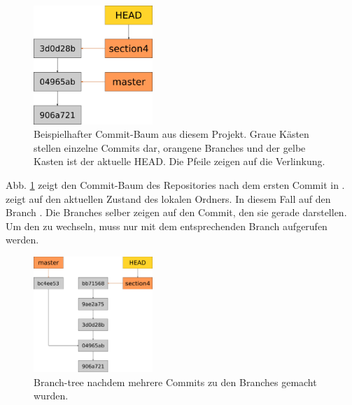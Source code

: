 \begin{figure}[!h]
	\centering
	\includegraphics[width=0.4\textwidth]{Bilder/branching.png}
	\caption{Beispielhafter Commit-Baum aus diesem Projekt. Graue Kästen stellen einzelne Commits dar, orangene Branches und der gelbe Kasten ist der aktuelle HEAD. Die Pfeile zeigen auf die Verlinkung.}
	\label{fig:branch_1}
\end{figure}
Abb. \ref{fig:branch_1} zeigt den Commit-Baum des Repositories nach dem ersten Commit in .  zeigt auf den aktuellen Zustand des lokalen Ordners. In diesem Fall auf den Branch . Die Branches selber zeigen auf den Commit, den sie gerade darstellen. Um den  zu wechseln, muss nur  mit dem entsprechenden Branch aufgerufen werden.
\begin{figure}[!h]
	\centering
	\includegraphics[width=0.4\textwidth]{Bilder/branching_2.png}
	\caption{Branch-tree nachdem mehrere Commits zu den Branches gemacht wurden.}
	\label{fig:branch_2}
\end{figure}

